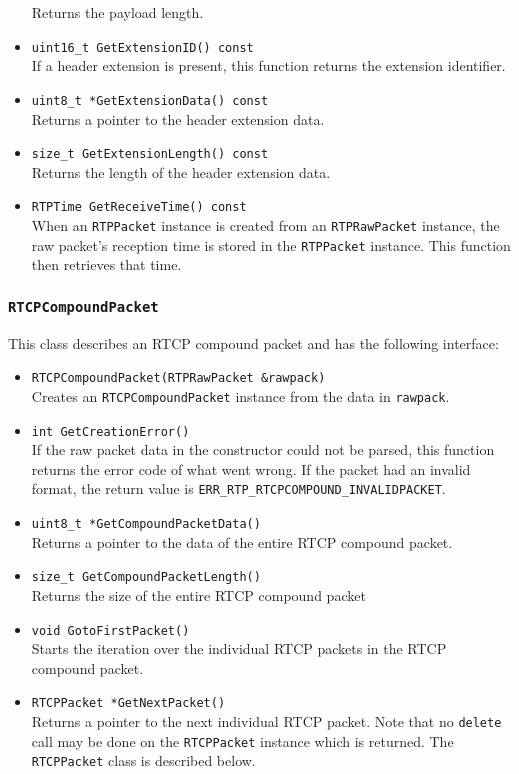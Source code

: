 \documentclass[12pt,a4paper]{article}
\newcommand{\headerfile}[1]{\marginpar{\scriptsize Header:\\{\tt #1}}}
\begin{document}
\begin{itemize}
						Returns the payload length.
					\item {\tt uint16\_t GetExtensionID() const}\\
						If a header extension is present, this function
						returns the extension identifier.
					\item {\tt uint8\_t *GetExtensionData() const}\\
						Returns a pointer to the header extension data.
					\item {\tt size\_t GetExtensionLength() const}\\
						Returns the length of the header extension data.
					\item {\tt RTPTime GetReceiveTime() const}\\
						When an {\tt RTPPacket} instance is created from 
						an {\tt RTPRawPacket} instance, the raw packet's 
						reception time is stored in the {\tt RTPPacket}
						instance. This function then retrieves that time.
				\end{itemize}

			\subsubsection{\tt RTCPCompoundPacket}\headerfile{rtpcompoundpacket.h}

				This class describes an RTCP compound packet and has the following
				interface:
				\begin{itemize}
					\item {\tt RTCPCompoundPacket(RTPRawPacket \&rawpack)}\\
						Creates an {\tt RTCPCompoundPacket} instance from the
						data in {\tt rawpack}.
					\item {\tt int GetCreationError()}\\
						If the raw packet data in the constructor could not
						be parsed, this function returns the error code of
						what went wrong. If the packet had an invalid format,
						the return value is {\tt ERR\_\-RTP\_\-RTCPCOMPOUND\_\-INVALID\-PACKET}.
					\item {\tt uint8\_t *GetCompoundPacketData()}\\
						Returns a pointer to the data of the entire RTCP compound packet.
					\item {\tt size\_t GetCompoundPacketLength()}\\
						Returns the size of the entire RTCP compound packet
					\item {\tt void GotoFirstPacket()}\\
						Starts the iteration over the individual RTCP packets in
						the RTCP compound packet.
					\item {\tt RTCPPacket *GetNextPacket()}\\
						Returns a pointer to the next individual RTCP packet. Note
						that no {\tt delete} call may be done on the {\tt RTCPPacket}
						instance which is returned. The {\tt RTCPPacket} class is
						described below.
				\end{itemize}
				
\end{document}
